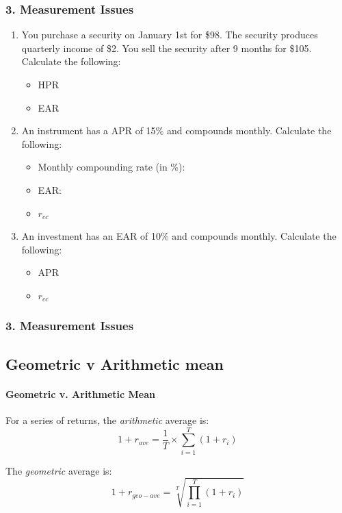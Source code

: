 \documentclass{beamer}
\begin{document}
\begin{practiceframe}
    \frametitle{3. Measurement Issues}
    
    \begin{enumerate}
        \item You purchase a security on January 1st for \$98.  The security produces quarterly income of \$2.  You sell the security after 9 months for \$105.   Calculate the following:
    \begin{itemize}
        \item HPR
        \item EAR
    \end{itemize}
    \item An instrument has a APR of 15\% and compounds monthly.  Calculate the following:
        \begin{itemize}
        \item Monthly compounding rate (in \%):
        \item EAR: 
        \item $r_{cc}$
    \end{itemize}
    \item An investment has an EAR of 10\% and compounds monthly. Calculate the following:
    \begin{itemize}
        \item APR
        \item $r_{cc}$
    \end{itemize}
    \end{enumerate}
    
\end{practiceframe}

\begin{frame}[t]
    \frametitle{3. Measurement Issues}
    \subsection{Geometric v Arithmetic mean}
    \framesubtitle{Geometric v. Arithmetic Mean}

    For a series of returns, the \textit{arithmetic} average is:
    $$1+ r_{ave} = \frac{1}{T}\times\sum_{i=1}^{T}(1 + r_i)$$

    The \textit{geometric} average is:
    $$1+ r_{geo-ave} = \sqrt[T]{\prod_{i=1}^{T} (1 + r_i)}$$

\end{frame}
\end{document}
